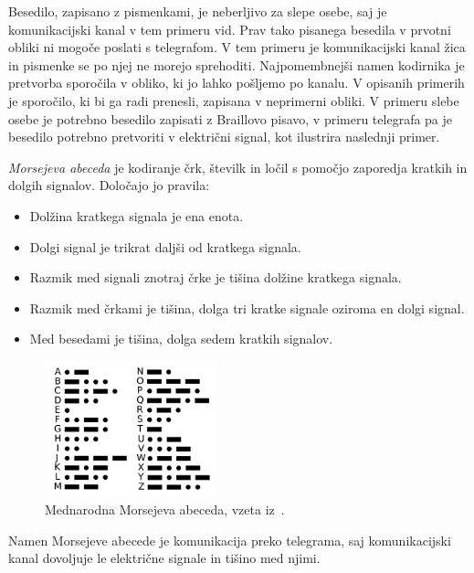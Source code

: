 \documentclass[fin1, tisk]{fmfdelo}
\theoremstyle{definition}
\begin{document}
Besedilo, zapisano z pismenkami, je neberljivo za slepe osebe, saj je komunikacijski kanal v tem
primeru vid. Prav tako pisanega besedila v prvotni obliki ni mogoče poslati s telegrafom. 
V tem primeru je komunikacijski kanal žica in pismenke se po njej ne morejo sprehoditi. 
Najpomembnejši namen kodirnika je pretvorba sporočila v obliko, ki jo lahko pošljemo po kanalu.
V opisanih primerih je sporočilo, ki bi ga radi prenesli, zapisana v neprimerni obliki. V primeru
slebe osebe je potrebno besedilo zapisati z Braillovo pisavo, v primeru telegrafa pa je besedilo 
potrebno pretvoriti v električni signal, kot ilustrira naslednji primer.
\begin{primer}\label{primer:mors}
    \emph{Morsejeva abeceda} je kodiranje črk, številk in ločil s pomočjo 
    zaporedja kratkih in dolgih signalov. Določajo jo pravila:
    \begin{itemize}
        \item Dolžina kratkega signala je ena enota.
        \item Dolgi signal je trikrat daljši od kratkega signala.
        \item Razmik med signali znotraj črke je tišina dolžine kratkega signala.
        \item Razmik med črkami je tišina, dolga tri kratke signale oziroma en dolgi signal.
        \item Med besedami je tišina, dolga sedem kratkih signalov.
    \end{itemize}
    \begin{figure}[H]
        \centering
        \includegraphics[width=5cm]{1280px-InternationalMorseCode.svg.png}
        \caption{Mednarodna Morsejeva abeceda, vzeta iz~\cite{morseletters}.}
        \label{fig:morse}
    \end{figure}
    Namen Morsejeve abecede je komunikacija preko telegrama, saj komunikacijski kanal dovoljuje 
    le električne signale in tišino med njimi.
\end{primer}
\end{document}
